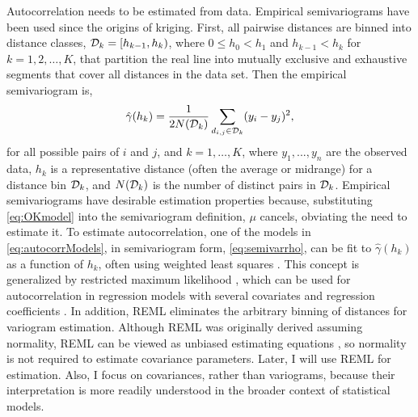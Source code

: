 \documentclass[11pt, titlepage]{article}\usepackage[]{graphicx}\usepackage[]{color}
\begin{document}
\begin{spacing}{1.9}
\begin{flushleft}
Autocorrelation needs to be estimated from data. Empirical semivariograms have been used since the origins of kriging. First, all pairwise distances are binned into distance classes, $\mathcal{D}_k = [h_{k-1},h_k)$, where $0 \le h_0 < h_1$ and $h_{k-1} < h_k$ for $k = 1, 2, \ldots, K$, that partition the real line into mutually exclusive and exhaustive segments that cover all distances in the data set.  Then the empirical semivariogram is,
\[
				\hat{\gamma}(h_k) = \frac{1}{2N(\mathcal{D}_k)}\sum_{d_{i,j} \in \mathcal{D}_k} (y_i - y_j)^2,
\]
for all possible pairs of $i$ and $j$, and $k = 1, \ldots, K$, where $y_1, . . . ,y_n$ are the observed data, $h_k$ is a representative distance (often the average or midrange) for a distance bin $\mathcal{D}_k$, and $N(\mathcal{D}_k)$ is the number of distinct pairs in $\mathcal{D}_k$. Empirical semivariograms have desirable estimation properties \citep[it is an unbiased estimator,][p. 71]{Cres:stat:1993} because, substituting \ref{eq:OKmodel} into the semivariogram definition, $\mu$ cancels, obviating the need to estimate it.  To estimate autocorrelation, one of the models in \ref{eq:autocorrModels}, in semivariogram form, \ref{eq:semivarrho}, can be fit to $\hat{\gamma}(h_k)$ as a function of $h_k$, often using weighted least squares \citep{Cres:fitt:1985}.  This concept is generalized by restricted maximum likelihood \citep[REML, ][]{Patt:Thom:reco:1971, Patt:Thom:maxi:1974}, which can be used for autocorrelation in regression models with several covariates and regression coefficients \citep[for REML applied to spatial models, see, e.g.,][p. 93]{Cres:stat:1993}. In addition, REML eliminates the arbitrary binning of distances for variogram estimation.  Although REML was originally derived assuming normality, REML can be viewed as unbiased estimating equations \citep{Heyd:quas:1994, Cres:Lahi:asym:1996}, so normality is not required to estimate covariance parameters.  Later, I will use REML for estimation. Also, I focus on covariances, rather than variograms, because their interpretation is more readily understood in the broader context of statistical models.


\end{flushleft}
\end{spacing}
\end{document}

